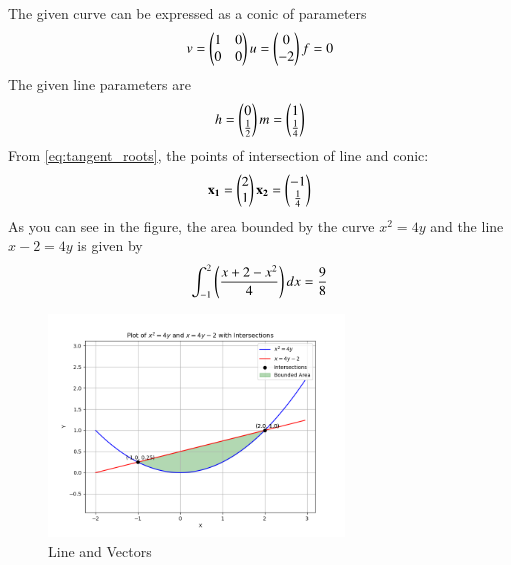 \documentclass[journal]{IEEEtran}
\begin{document}
The given curve can be expressed as a conic of parameters
\begin{align}
	v=\begin{pmatrix}1&0\\0&0\end{pmatrix} u=\begin{pmatrix}0\\-2\end{pmatrix} f=0 
\end{align}
The given line parameters are
\begin{align}
	h=\begin{pmatrix}0\\ \frac{1}{2}\end{pmatrix} m=\begin{pmatrix}1\\\frac{1}{4}\end{pmatrix}
\end{align}
From \eqref{eq:tangent_roots}, the points of intersection of line and conic:
\begin{align}
	\mathbf{x_1} = \begin{pmatrix}2\\1\end{pmatrix} \mathbf{x_2} = \begin{pmatrix}-1\\\frac{1}{4}\end{pmatrix}
\end{align}
As you can see in the figure, the area bounded by the curve $x^{2} = 4y$ and the line $x - 2 = 4y $  is given by
\begin{align}
	\int_{-1}^{2} \left(\frac{x + 2 - x^{2}}{4}\right)dx = \frac{9}{8} 
\end{align}
\newpage
\begin{figure}[h!]
\begin{center}
	\includegraphics[width=0.7\textwidth]{Fig/fig.png}
	\caption{Line and Vectors}
	\label{fig:9-9.2-22 - Figure -1}
\end{center}
\end{figure}
\end{document}
